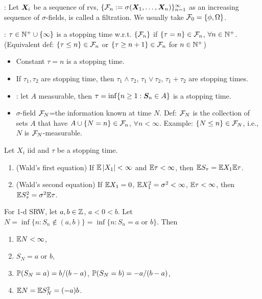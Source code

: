 \documentclass[10pt,a4paper]{article}
\begin{document}
\noindent {}: Let $\X_i$ be a sequence of rvs, $\{\calF_n:=\sigma(\X_1,\ldots,\X_n)\}_{n=1}^\infty $ as an increasing sequence of $\sigma$-fields, is called a filtration. We usually take $\calF_0=\{\phi,\Omega\}$.  

\noindent {}: $\tau\in\bbN^+\cup\{\infty \}$ is a stopping time w.r.t. $\{\calF_n\}$ if $\{\tau=n\}\in\calF_n$, $\forall n\in\bbN^+$. (Equivalent def: $\{\tau\leq n\}\in\calF_n$ or $\{\tau\geq n+1\}\in\calF_n$ for $n\in\bbN^+$)
\begin{itemize}
	\item Constant $\tau=n$ is a stopping time. 
	\item If $\tau_1,\tau_2$ are stopping time, then $\tau_1\wedge\tau_2$, $\tau_1\vee\tau_2$, $\tau_1+\tau_2$ are stopping times.    
	\item {}: let $A$ measurable, then $\tau=\inf\{n\geq 1:\S_n\in A\}$ is a stopping time.     
	\item $\sigma$-field $\calF_N$=the information known at time $N$. Def: $\calF_N$ is the collection of sets $A$ that have $A\cup\{N=n\}\in\calF_n$, $\forall n< \infty $. Example: $\{N\leq n\}\in\calF_N$, i.e., $N$ is $\calF_N$-measurable.          
\end{itemize}

\begin{thmbox}
	\begin{theorem}\label{thm:WaldEq}
		
	Let $X_i$ iid and $\tau$ be a stopping time. 
	\begin{enumerate}
		\item (Wald's first equation)
		If $\bbE \abs{X_1}< \infty $ and $\bbE \tau < \infty $, then $\bbE S_{\tau}=\bbE X_1 \bbE \tau$.     
		\item (Wald's second equation) If $\bbE X_1=0$, $\bbE X_1^2=\sigma^2<\infty$, $\bbE \tau < \infty $, then $\bbE S_{\tau}^2=\sigma^2 \bbE \tau$.    
	\end{enumerate}
	\end{theorem}
\end{thmbox}

\begin{exbox}
\begin{example}\label{eg:1dSRW}
	For 1-d SRW, let $a,b\in\bbZ$, $a<0<b$. Let $N=\inf \{n: S_n\notin (a,b)\}=\inf\{n:S_n=a \text{ or } b\}$. Then 
	\begin{enumerate}
		\item $\bbE N <\infty $,
		\item $S_N=a$ or $b$,
		\item $\bbP (S_N=a)=b/(b-a)$, $\bbP(S_N=b)=-a/(b-a)$,
		\item $\bbE N=\bbE S_N^2=(-a)b$.      
	\end{enumerate} 
\end{example}
\end{exbox}
\end{document}
